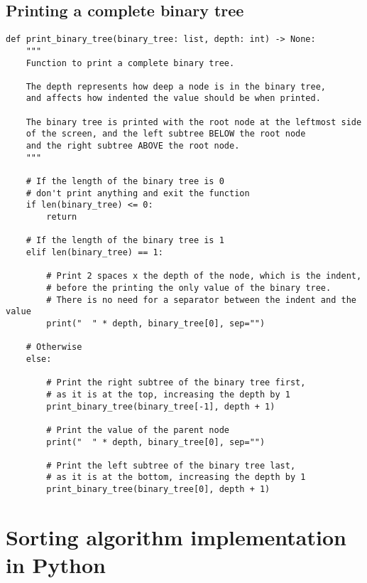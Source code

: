\documentclass[11pt]{article}
\begin{document}
 \newpage
\subsection{Printing a complete binary tree}
\label{sec:org940b551}
\begin{verbatim}
def print_binary_tree(binary_tree: list, depth: int) -> None:
    """
    Function to print a complete binary tree.

    The depth represents how deep a node is in the binary tree,
    and affects how indented the value should be when printed.

    The binary tree is printed with the root node at the leftmost side
    of the screen, and the left subtree BELOW the root node
    and the right subtree ABOVE the root node.
    """

    # If the length of the binary tree is 0
    # don't print anything and exit the function
    if len(binary_tree) <= 0:
        return

    # If the length of the binary tree is 1
    elif len(binary_tree) == 1:

        # Print 2 spaces x the depth of the node, which is the indent,
        # before the printing the only value of the binary tree.
        # There is no need for a separator between the indent and the value
        print("  " * depth, binary_tree[0], sep="")

    # Otherwise
    else:

        # Print the right subtree of the binary tree first,
        # as it is at the top, increasing the depth by 1
        print_binary_tree(binary_tree[-1], depth + 1)

        # Print the value of the parent node
        print("  " * depth, binary_tree[0], sep="")

        # Print the left subtree of the binary tree last,
        # as it is at the bottom, increasing the depth by 1
        print_binary_tree(binary_tree[0], depth + 1)
\end{verbatim}

 \newpage
\section{Sorting algorithm implementation in Python}
\label{sec:orgcf56954}
\end{document}
